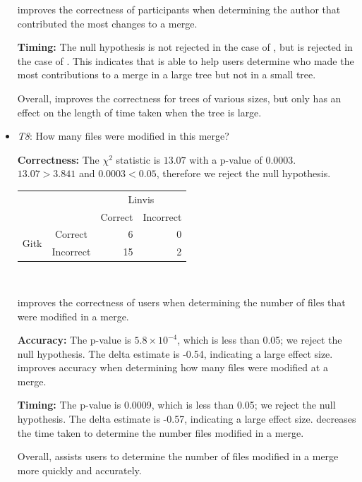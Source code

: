 \begin{itemize}
    \tool improves the correctness of participants when determining the
    author that contributed the most changes to a merge.

    \textbf{Timing:} The null hypothesis is not rejected in the case of
    \comA, but is rejected in the case of \comB. This indicates that
    \tool is able to help users determine who made the most
    contributions to a merge in a large tree but not in a small tree.

    Overall, \tool improves the correctness for trees of various sizes,
    but only has an effect on the length of time taken when the tree is
    large.

  \item \emph{T8}: How many files were modified in this merge?

    \textbf{Correctness:}
    The $\chi^2$ statistic is $13.07$ with a p-value of $0.0003$.
    $13.07 > 3.841$ and $0.0003 < 0.05$, therefore we reject the null
    hypothesis.

    \vspace{2mm}
    \begin{tabular}{cc|rr}
      &           & \multicolumn{2}{c}{Linvis}\\
      &           & Correct                      & Incorrect\\\hline
      \multirow{2}{*}{Gitk} & Correct   & 6                            & 0\\
      & Incorrect & 15                           & 2\\
    \end{tabular}\\
    \vspace{3mm}

    \tool improves the correctness of users when determining the number
    of files that were modified in a merge.

    \textbf{Accuracy:} The p-value is $5.8 \times 10^{-4}$, which is
    less than 0.05; we reject the null hypothesis. The delta estimate is
    -0.54, indicating a large effect size. \tool improves accuracy when
    determining how many files were modified at a merge.

    \textbf{Timing:} The p-value is 0.0009, which is less than 0.05; we
    reject the null hypothesis. The delta estimate is -0.57, indicating
    a large effect size. \tool decreases the time taken to determine the
    number files modified in a merge.

    Overall, \tool assists users to determine the number of files
    modified in a merge more quickly and accurately.


\end{itemize}
